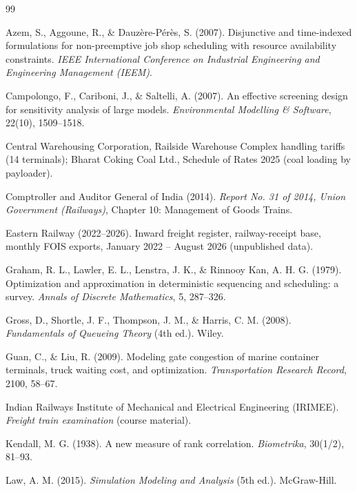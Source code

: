 \renewcommand{\bibname}{References}
\begin{thebibliography}{99}
\small{}

Azem, S., Aggoune, R., \& Dauz\`ere-P\'er\`es, S. (2007). Disjunctive and time-indexed formulations for non-preemptive job shop scheduling with resource availability constraints. \textit{IEEE International Conference on Industrial Engineering and Engineering Management (IEEM)}.

Campolongo, F., Cariboni, J., \& Saltelli, A. (2007). An effective screening design for sensitivity analysis of large models. \textit{Environmental Modelling \& Software}, 22(10), 1509--1518.

Central Warehousing Corporation, Railside Warehouse Complex handling tariffs (14 terminals); Bharat Coking Coal Ltd., Schedule of Rates 2025 (coal loading by payloader).

Comptroller and Auditor General of India (2014). \textit{Report No. 31 of 2014, Union Government (Railways)}, Chapter 10: Management of Goods Trains.

Eastern Railway (2022--2026). Inward freight register, railway-receipt base, monthly FOIS exports, January 2022 -- August 2026 (unpublished data).

Graham, R. L., Lawler, E. L., Lenstra, J. K., \& Rinnooy Kan, A. H. G. (1979). Optimization and approximation in deterministic sequencing and scheduling: a survey. \textit{Annals of Discrete Mathematics}, 5, 287--326.

Gross, D., Shortle, J. F., Thompson, J. M., \& Harris, C. M. (2008). \textit{Fundamentals of Queueing Theory} (4th ed.). Wiley.

Guan, C., \& Liu, R. (2009). Modeling gate congestion of marine container terminals, truck waiting cost, and optimization. \textit{Transportation Research Record}, 2100, 58--67.

Indian Railways Institute of Mechanical and Electrical Engineering (IRIMEE). \textit{Freight train examination} (course material).

Kendall, M. G. (1938). A new measure of rank correlation. \textit{Biometrika}, 30(1/2), 81--93.

Law, A. M. (2015). \textit{Simulation Modeling and Analysis} (5th ed.). McGraw-Hill.


\end{thebibliography}
